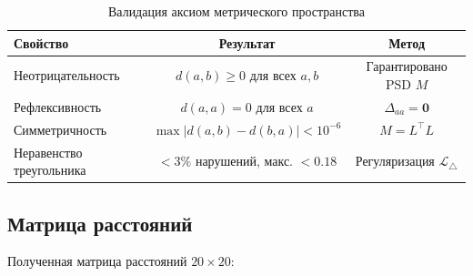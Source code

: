 \documentclass[12pt]{article}
\begin{document}
\begin{table}[h]
\centering
\caption{Валидация аксиом метрического пространства}
\label{tab:metric_props}
\begin{tabular}{lcc}
\toprule
\textbf{Свойство} & \textbf{Результат} & \textbf{Метод} \\
\midrule
Неотрицательность & $d(a,b) \ge 0$ для всех $a,b$ & Гарантировано PSD $M$ \\
Рефлексивность & $d(a,a) = 0$ для всех $a$ & $\Delta_{aa} = \mathbf{0}$ \\
Симметричность & $\max|d(a,b)-d(b,a)| < 10^{-6}$ & $M = L^{\top}L$ \\
Неравенство треугольника & $< 3\%$ нарушений, макс. $< 0.18$ & Регуляризация $\mathcal{L}_{\triangle}$ \\
\bottomrule
\end{tabular}
\end{table}

\subsection{Матрица расстояний}

Полученная матрица расстояний $20 \times 20$:
\end{document}
